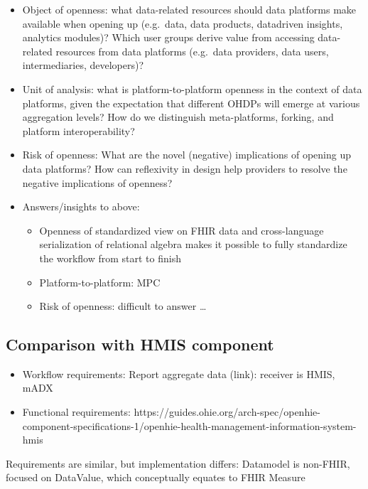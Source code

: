 \documentclass[
  authoryear]{elsarticle}
\providecommand{\tightlist}{%
  \setlength{\itemsep}{0pt}\setlength{\parskip}{0pt}}\usepackage{longtable,booktabs,array}
\begin{document}
\begin{itemize}
\tightlist
\item
  Object of openness: what data-related resources should data platforms
  make available when opening up (e.g.~data, data products, datadriven
  insights, analytics modules)? Which user groups derive value from
  accessing data-related resources from data platforms (e.g.~data
  providers, data users, intermediaries, developers)?
\item
  Unit of analysis: what is platform-to-platform openness in the context
  of data platforms, given the expectation that different OHDPs will
  emerge at various aggregation levels? How do we distinguish
  meta-platforms, forking, and platform interoperability?
\item
  Risk of openness: What are the novel (negative) implications of
  opening up data platforms? How can reflexivity in design help
  providers to resolve the negative implications of openness?
\item
  Answers/insights to above:

  \begin{itemize}
  \tightlist
  \item
    Openness of standardized view on FHIR data and cross-language
    serialization of relational algebra makes it possible to fully
    standardize the workflow from start to finish
  \item
    Platform-to-platform: MPC
  \item
    Risk of openness: difficult to answer \ldots{}
  \end{itemize}
\end{itemize}

\subsection{Comparison with HMIS
component}\label{comparison-with-hmis-component}

\begin{itemize}
\tightlist
\item
  Workflow requirements: Report aggregate data (link): receiver is HMIS,
  mADX
\item
  Functional requirements:
  https://guides.ohie.org/arch-spec/openhie-component-specifications-1/openhie-health-management-information-system-hmis
\end{itemize}

Requirements are similar, but implementation differs: Datamodel is
non-FHIR, focused on DataValue, which conceptually equates to FHIR
Measure
\end{document}
